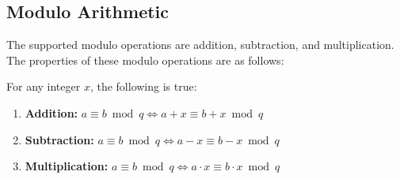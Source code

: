 \subsection{Modulo Arithmetic}
\label{subsec:modulo-arithmetic}


The supported modulo operations are addition, subtraction, and multiplication. The properties of these modulo operations are as follows:

\begin{tcolorbox}[title={\textbf{\tboxtheorem{\ref*{subsec:group-def}.1} Properties of Modulo Operations}}]
For any integer $x$, the following is true:

\begin{enumerate}
\item \textbf{Addition:} $a \equiv b \bmod q \Longleftrightarrow a + x\equiv b + x\bmod q$

\item \textbf{Subtraction:} $a \equiv b \bmod q \Longleftrightarrow a - x\equiv b - x\bmod q$

\item \textbf{Multiplication:} $a \equiv b \bmod q \Longleftrightarrow a \cdot x\equiv b \cdot x\bmod q$

\end{enumerate}

\end{tcolorbox}


